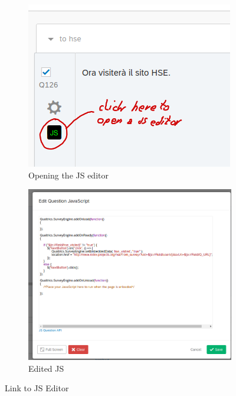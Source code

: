 \documentclass[a4paper]{usiinfbachelorproject}
\begin{document}
\begin{appendices}
        \begin{figure} [h]
             \centering
             \hfill
             \begin{subfigure}[c]{0.3\textwidth}
                 \centering
                 \includegraphics[width=\textwidth]{figures/qsl1}
                 \caption{Opening the JS editor}
                 \label{fig:qsl1}
             \end{subfigure}
             \hfill
             \begin{subfigure}[c]{0.35\textwidth}
                 \centering
                 \includegraphics[width=\textwidth]{figures/qsl2}
                 \caption{Edited JS}
                 \label{fig:qsl2}
             \end{subfigure}
             \hfill
             \caption[]{Link to JS Editor}
             \label{fig:qualtricsLinkJs}
        \end{figure}


\end{appendices}
\end{document}
